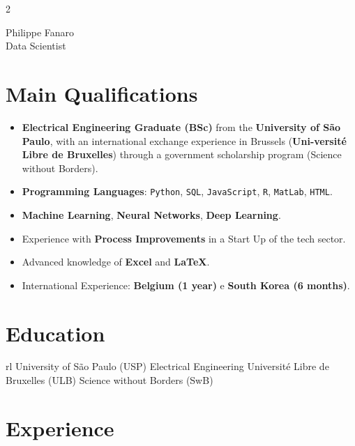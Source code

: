 \documentclass[10pt]{article} %
\newcommand{\code}[1]{\colorbox{light-gray}{\texttt{#1}}}
\begin{document}
\begin{paracol}{2}

\parbox[top][0.12\textheight][c]{\linewidth}{
	\vspace{-0.04\textheight}
	\centering
	{\sffamily\Huge Philippe Fanaro}\\\medskip
	{\huge\color{headings} Data Scientist}
}

\section{Main Qualifications}

\begin{itemize}
    \itemsep0em
    \item \textbf{Electrical Engineering Graduate (BSc)} from the \textbf{University of São Paulo}, with an international exchange experience in Brussels (\textbf{Uni-versité Libre de Bruxelles}) through a government scholarship program (Science without Borders).
    \item \textbf{Programming Languages}: \code{\small Python}, \code{\small SQL}, \code{\small JavaScript}, \code{\small R}, \code{\small MatLab}, \code{\small HTML}.
    \item \textbf{Machine Learning}, \textbf{Neural Networks}, \textbf{Deep Learning}.
    \item Experience with \textbf{Process Improvements} in a Start Up of the tech sector.
    \item Advanced knowledge of \textbf{Excel} and \textbf{LaTeX}.
    \item International Experience: \textbf{Belgium (1 year)} e \textbf{South Korea (6 months)}.
\end{itemize}

\section{Education} 

\begin{supertabular}{rl}
{University of São Paulo (USP)}
{Electrical Engineering}
{}
{}
{Université Libre de Bruxelles (ULB)}
{Science without Borders (SwB)}
{}
{}
\end{supertabular}

\section{Experience}


\end{paracol}
\end{document}
